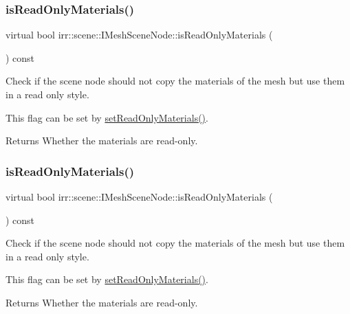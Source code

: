 \subsubsection{\texorpdfstring{is\+Read\+Only\+Materials()}{isReadOnlyMaterials()}\hspace{0.1cm}{\footnotesize\ttfamily [1/2]}}
{\footnotesize\ttfamily virtual bool irr\+::scene\+::\+I\+Mesh\+Scene\+Node\+::is\+Read\+Only\+Materials (\begin{DoxyParamCaption}{ }\end{DoxyParamCaption}) const\hspace{0.3cm}{\ttfamily [pure virtual]}}



Check if the scene node should not copy the materials of the mesh but use them in a read only style. 

This flag can be set by \hyperlink{classirr_1_1scene_1_1IMeshSceneNode_a3bae73b4f7b1a6b265a62ece964c008f}{set\+Read\+Only\+Materials()}. \begin{DoxyReturn}{Returns}
Whether the materials are read-\/only. 
\end{DoxyReturn}
\mbox{\label{classirr_1_1scene_1_1IMeshSceneNode_a1d7de4331b84480598f636c929418e3d}} 
\subsubsection{\texorpdfstring{is\+Read\+Only\+Materials()}{isReadOnlyMaterials()}\hspace{0.1cm}{\footnotesize\ttfamily [2/2]}}
{\footnotesize\ttfamily virtual bool irr\+::scene\+::\+I\+Mesh\+Scene\+Node\+::is\+Read\+Only\+Materials (\begin{DoxyParamCaption}{ }\end{DoxyParamCaption}) const\hspace{0.3cm}{\ttfamily [pure virtual]}}



Check if the scene node should not copy the materials of the mesh but use them in a read only style. 

This flag can be set by \hyperlink{classirr_1_1scene_1_1IMeshSceneNode_a3bae73b4f7b1a6b265a62ece964c008f}{set\+Read\+Only\+Materials()}. \begin{DoxyReturn}{Returns}
Whether the materials are read-\/only. 
\end{DoxyReturn}
\mbox{\label{classirr_1_1scene_1_1IMeshSceneNode_a8d7e98ddfb990bfc354c9c410a4d788f}} 
